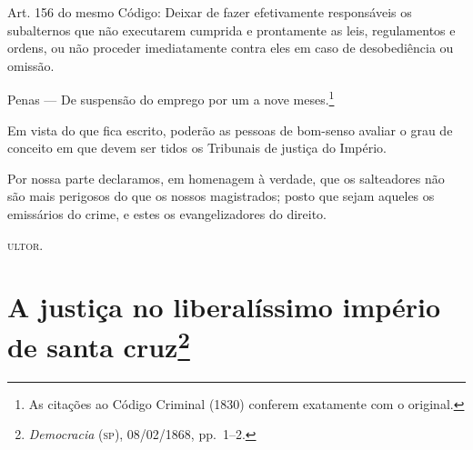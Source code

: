 Art. 156 do mesmo Código: Deixar de fazer efetivamente responsáveis os
subalternos que não executarem cumprida e prontamente as leis,
regulamentos e ordens, ou não proceder imediatamente contra eles em caso
de desobediência ou omissão.

Penas --- De suspensão do emprego por um a nove meses.\footnote{As
  citações ao Código Criminal (1830) conferem exatamente com o original.}

Em vista do que fica escrito, poderão as pessoas de bom-senso avaliar o
grau de conceito em que devem ser tidos os Tribunais de justiça do
Império.

Por nossa parte declaramos, em homenagem à verdade, que os salteadores
não são mais perigosos do que os nossos magistrados; posto que sejam
aqueles os emissários do crime, e estes os evangelizadores do direito.

\textsc{ultor}.

\chapter{A justiça no liberalíssimo império de santa cruz\footnote{\emph{Democracia} (\textsc{sp}), 08/02/1868, pp.~1--2.}}

